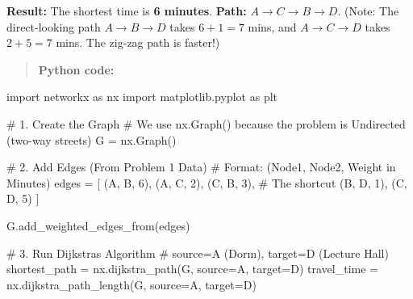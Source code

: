 \documentclass[
  letterpaper,
  DIV=11,
  numbers=noendperiod]{scrreprt}
\newenvironment{Shaded}{\begin{snugshade}}{\end{snugshade}}
\newcommand{\CommentTok}[1]{\textcolor[rgb]{0.37,0.37,0.37}{#1}}
\newcommand{\DecValTok}[1]{\textcolor[rgb]{0.68,0.00,0.00}{#1}}
\newcommand{\ImportTok}[1]{\textcolor[rgb]{0.00,0.46,0.62}{#1}}
\newcommand{\NormalTok}[1]{\textcolor[rgb]{0.00,0.23,0.31}{#1}}
\newcommand{\OperatorTok}[1]{\textcolor[rgb]{0.37,0.37,0.37}{#1}}
\newcommand{\StringTok}[1]{\textcolor[rgb]{0.13,0.47,0.30}{#1}}
\begin{document}
\textbf{Result:} The shortest time is \textbf{6 minutes}. \textbf{Path:}
\(A \to C \to B \to D\). (Note: The direct-looking path
\(A \to B \to D\) takes \(6+1=7\) mins, and \(A \to C \to D\) takes
\(2+5=7\) mins. The zig-zag path is faster!)

\begin{quote}
\textbf{Python code:}
\end{quote}

\begin{Shaded}
\begin{Highlighting}[]
\ImportTok{import}\NormalTok{ networkx }\ImportTok{as}\NormalTok{ nx}
\ImportTok{import}\NormalTok{ matplotlib.pyplot }\ImportTok{as}\NormalTok{ plt}

\CommentTok{\# 1. Create the Graph}
\CommentTok{\# We use nx.Graph() because the problem is Undirected (two{-}way streets)}
\NormalTok{G }\OperatorTok{=}\NormalTok{ nx.Graph()}

\CommentTok{\# 2. Add Edges (From Problem 1 Data)}
\CommentTok{\# Format: (Node1, Node2, Weight in Minutes)}
\NormalTok{edges }\OperatorTok{=}\NormalTok{ [}
\NormalTok{    (}\StringTok{\textquotesingle{}A\textquotesingle{}}\NormalTok{, }\StringTok{\textquotesingle{}B\textquotesingle{}}\NormalTok{, }\DecValTok{6}\NormalTok{),}
\NormalTok{    (}\StringTok{\textquotesingle{}A\textquotesingle{}}\NormalTok{, }\StringTok{\textquotesingle{}C\textquotesingle{}}\NormalTok{, }\DecValTok{2}\NormalTok{),}
\NormalTok{    (}\StringTok{\textquotesingle{}C\textquotesingle{}}\NormalTok{, }\StringTok{\textquotesingle{}B\textquotesingle{}}\NormalTok{, }\DecValTok{3}\NormalTok{), }\CommentTok{\# The shortcut}
\NormalTok{    (}\StringTok{\textquotesingle{}B\textquotesingle{}}\NormalTok{, }\StringTok{\textquotesingle{}D\textquotesingle{}}\NormalTok{, }\DecValTok{1}\NormalTok{),}
\NormalTok{    (}\StringTok{\textquotesingle{}C\textquotesingle{}}\NormalTok{, }\StringTok{\textquotesingle{}D\textquotesingle{}}\NormalTok{, }\DecValTok{5}\NormalTok{)}
\NormalTok{]}

\NormalTok{G.add\_weighted\_edges\_from(edges)}

\CommentTok{\# 3. Run Dijkstra\textquotesingle{}s Algorithm}
\CommentTok{\# source=\textquotesingle{}A\textquotesingle{} (Dorm), target=\textquotesingle{}D\textquotesingle{} (Lecture Hall)}
\NormalTok{shortest\_path }\OperatorTok{=}\NormalTok{ nx.dijkstra\_path(G, source}\OperatorTok{=}\StringTok{\textquotesingle{}A\textquotesingle{}}\NormalTok{, target}\OperatorTok{=}\StringTok{\textquotesingle{}D\textquotesingle{}}\NormalTok{)}
\NormalTok{travel\_time }\OperatorTok{=}\NormalTok{ nx.dijkstra\_path\_length(G, source}\OperatorTok{=}\StringTok{\textquotesingle{}A\textquotesingle{}}\NormalTok{, target}\OperatorTok{=}\StringTok{\textquotesingle{}D\textquotesingle{}}\NormalTok{)}


\end{Highlighting}
\end{Shaded}
\end{document}
